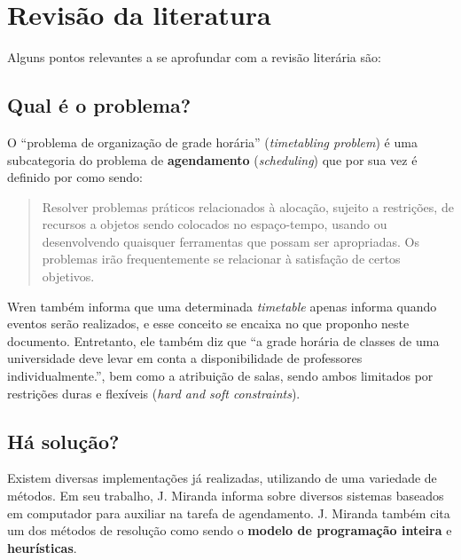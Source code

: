 \chapter{Revisão da literatura}

Alguns pontos relevantes a se aprofundar com a revisão literária são:

\section{Qual é o problema?}

O ``problema de organização de grade horária'' (\textit{timetabling problem}) é uma subcategoria do problema de \textbf{agendamento} (\textit{scheduling}) que por sua vez é definido por \cite{WREN1996} como sendo:

\begin{quote}\footnotesize
  Resolver problemas práticos relacionados à alocação, sujeito a restrições, de recursos a objetos sendo colocados no espaço-tempo, usando ou desenvolvendo quaisquer ferramentas que possam ser apropriadas. Os problemas irão frequentemente se relacionar à satisfação de certos objetivos.
\end{quote}

Wren também informa que uma determinada \textit{timetable} apenas informa quando eventos serão realizados, e esse conceito se encaixa no que proponho neste documento. Entretanto, ele também diz que ``a grade horária de classes de uma universidade deve levar em conta a disponibilidade de professores individualmente.'', bem como a atribuição de salas, sendo ambos limitados por restrições duras e flexíveis (\textit{hard and soft constraints}).

\section{Há solução?}

Existem diversas implementações já realizadas, utilizando de uma variedade de métodos. Em seu trabalho, J. Miranda \cite{MIRANDA2012505} informa sobre diversos sistemas baseados em computador para auxiliar na tarefa de agendamento. J. Miranda também cita um dos métodos de resolução como sendo o \textbf{modelo de programação inteira} e \textbf{heurísticas}.


